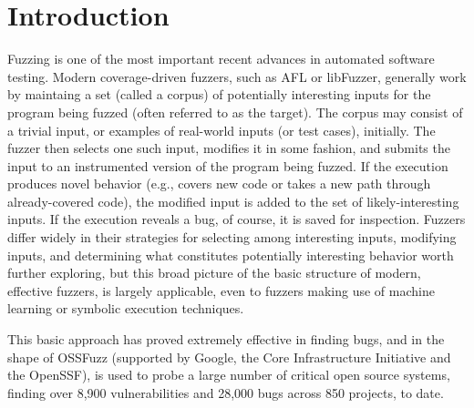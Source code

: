 





\section{Introduction}
\label{sec:intro}

Fuzzing \cite{fuzzoverview} is one of the most important recent advances in 
automated software testing.  Modern coverage-driven fuzzers, such as AFL or 
libFuzzer, generally work by maintaing a set (called a corpus) of potentially interesting 
inputs for the program being fuzzed (often referred to as the target).  The corpus may consist of a 
trivial input, or examples of real-world inputs (or test cases), initially.  
The fuzzer then selects one such input, modifies it in some fashion, and 
submits the input to an instrumented version of the program being fuzzed.  If 
the execution produces novel behavior (e.g., covers new code or takes a new 
path through already-covered code), the modified input is added to the set of 
likely-interesting inputs.   If the execution reveals a bug, of course, it is 
saved for inspection.   Fuzzers differ widely in their strategies for selecting 
among interesting inputs, modifying inputs, and determining what constitutes 
potentially interesting behavior worth further exploring, but this broad picture of the basic 
structure of modern, effective fuzzers, is largely applicable, even to fuzzers 
making use of machine learning or symbolic execution techniques.

This basic approach has proved extremely effective in finding bugs, and in the 
shape of OSSFuzz (supported by Google, the Core Infrastructure Initiative and 
the OpenSSF), is used to probe a large number of critical open source systems, 
finding over 8,900 vulnerabilities and 28,000 bugs across 850 projects, to date.

